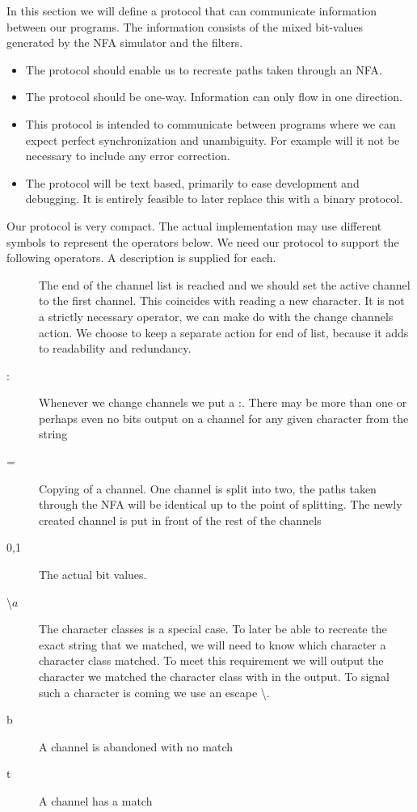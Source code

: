 
In this section we will define a protocol that can communicate
information between our programs. The information consists of the
mixed bit-values generated by the NFA simulator and the filters.

\begin{itemize}
\item The protocol should enable us to recreate paths taken through an
  NFA.
\item The protocol should be one-way. Information can only flow in one
  direction.
\item This protocol is intended to communicate between programs where
  we can expect perfect synchronization and unambiguity. For example
  will it not be necessary to include any error correction. 
\item The protocol will be text based, primarily to ease development
  and debugging. It is entirely feasible to later replace this with a
  binary protocol.
\end{itemize}

Our protocol is very compact. The actual implementation may use
different symbols to represent the operators below. We need our
protocol to support the following operators. A description is supplied
for each.

\begin{description}
  \item[\textbar] The end of the channel list is reached and we should
    set the active channel to the first channel. This coincides with
    reading a new character. It is not a strictly necessary operator,
    we can make do with the change channels action. We choose to keep
    a separate action for end of list, because it adds to readability
    and redundancy.
  \item[:] Whenever we change channels we put a :. There may be more
    than one or perhaps even no bits output on a channel for any given
    character from the string
  \item[=] Copying of a channel. One channel is split into two, the
    paths taken through the NFA will be identical up to the point of
    splitting. The newly created channel is put in front of the rest
    of the channels
  \item[0,1] The actual bit values. 
  \item [\textbackslash $a$] The character classes is a special
    case. To later be able to recreate the exact string that we
    matched, we will need to know which character a character class
    matched. To meet this requirement we will output the character we
    matched the character class with in the output. To signal such a
    character is coming we use an escape \textbackslash.
  \item[b] A channel is abandoned with no match
  \item[t] A channel has a match
\end{description}

